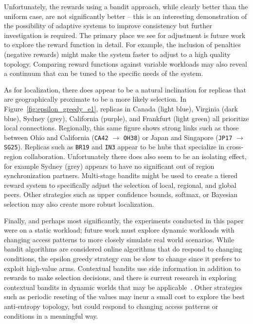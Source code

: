 Unfortunately, the rewards using a bandit approach, while clearly better
than the uniform case, are not significantly better -- this is an interesting
demonstration of the possibility of adaptive systems to improve consistency
but further investigation is required.
The primary place we see for adjustment is future work to explore the reward
function in detail.
For example, the inclusion of penalties (negative rewards) might make
the system faster to adjust to a high quality topology.
Comparing reward functions against variable workloads may also reveal a
continuum that can be tuned to the specific needs of the system.

As for localization, there does appear to be a natural inclination for
replicas that are geographically proximate to be a more likely selection.
In Figure~\ref{fig:epsilon_greedy_e1}, replicas in Canada (light blue),
Virginia (dark blue), Sydney (grey), California (purple), and Frankfurt
(light green) all prioritize local connections.
Regionally, this same figure shows strong links such as those between Ohio
and California (\texttt{CA42} $\rightarrow$ \texttt{OH38}) or Japan and
Singapore (\texttt{JP17} $\rightarrow$ \texttt{SG25}).
Replicas such as \texttt{BR19} and \texttt{IN3} appear to be hubs that
specialize in cross-region collaboration.
Unfortunately there does also seem to be an isolating effect, for example
Sydney (grey) appears to have no significant out of region synchronization
partners.
Multi-stage bandits might be used to create a tiered reward system to
specifically adjust the selection of local, regional, and global peers.
Other strategies such as upper confidence bounds, softmax, or Bayesian
selection may also create more robust localization.

Finally, and perhaps most significantly, the experiments conducted in
this paper were on a static workload; future work must explore dynamic
workloads with changing access patterns to more closely simulate real
world scenarios.
While bandit algorithms are considered online algorithms that do respond
to changing conditions, the epsilon greedy strategy can be slow to change
since it prefers to exploit high-value arms.
Contextual bandits use side information in addition to rewards to make
selection decisions, and there is current research in exploring contextual
bandits in dynamic worlds that may be applicable~\cite{contextual_bandits}.
Other strategies such as periodic reseting of the values may incur a small
cost to explore the best anti-entropy topology, but could respond to changing
access patterns or conditions in a meaningful way.

